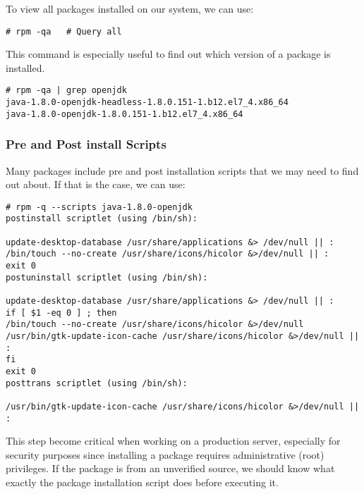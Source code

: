 \noindent
To view all packages installed on our system, we can use:

\vspace{-15pt}
\begin{verbatim}
# rpm -qa 	# Query all
\end{verbatim}
\vspace{-10pt}

\noindent
This command is especially useful to find out which version of a package is installed. 

\vspace{-15pt}
\begin{verbatim}
# rpm -qa | grep openjdk
java-1.8.0-openjdk-headless-1.8.0.151-1.b12.el7_4.x86_64
java-1.8.0-openjdk-1.8.0.151-1.b12.el7_4.x86_64
\end{verbatim}
\vspace{-10pt}

\subsubsection{Pre and Post install Scripts}
Many packages include pre and post installation scripts that we may need to find out about. If that is the case, we can use:

\vspace{-15pt}
\begin{verbatim}
# rpm -q --scripts java-1.8.0-openjdk
postinstall scriptlet (using /bin/sh):

update-desktop-database /usr/share/applications &> /dev/null || :
/bin/touch --no-create /usr/share/icons/hicolor &>/dev/null || :
exit 0
postuninstall scriptlet (using /bin/sh):

update-desktop-database /usr/share/applications &> /dev/null || :
if [ $1 -eq 0 ] ; then
/bin/touch --no-create /usr/share/icons/hicolor &>/dev/null
/usr/bin/gtk-update-icon-cache /usr/share/icons/hicolor &>/dev/null || :
fi
exit 0
posttrans scriptlet (using /bin/sh):

/usr/bin/gtk-update-icon-cache /usr/share/icons/hicolor &>/dev/null || :
\end{verbatim}
\vspace{-10pt}

\noindent
This step become critical when working on a production server, especially for security purposes since installing a package requires administrative (root) privileges. If the package is from an unverified source, we should know what exactly the package installation script does before executing it. 

